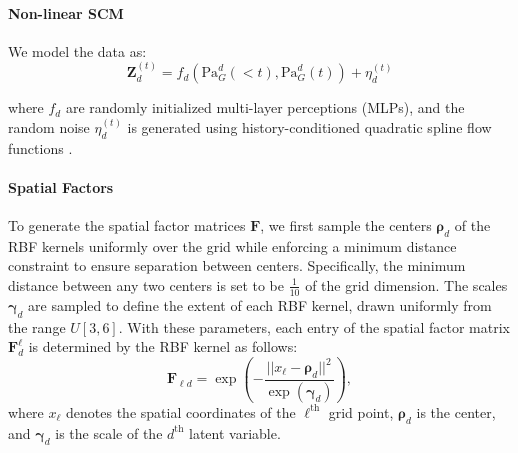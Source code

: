 \paragraph{Non-linear SCM} We model the data as:
\begin{equation*}
    \mathbf{Z}_d^{(t)} = f_{d}\left(\text{Pa}^d_G(<t), \text{Pa}^d_G(t)\right) + \eta_d^{(t)} 
\end{equation*}

where $f_d$ are randomly initialized multi-layer perceptions (MLPs), and the random noise $\eta_d^{(t)}$ is generated using history-conditioned quadratic spline flow functions \citep{durkan2019neural}. 

\paragraph{Spatial Factors} 

To generate the spatial factor matrices $\mathbf{F}$, we first sample the centers $\boldsymbol{\rho}_d$ of the RBF kernels uniformly over the grid while enforcing a minimum distance constraint to ensure separation between centers. Specifically, the minimum distance between any two centers is set to be $\frac{1}{10}$ of the grid dimension. The scales $\boldsymbol{\gamma}_d$ are sampled to define the extent of each RBF kernel, drawn uniformly from the range ${U}[3, 6]$. With these parameters, each entry of the spatial factor matrix $\mathbf{F}_d^\ell$ is determined by the RBF kernel as follows:
\begin{equation*}
\mathbf{F}_{\ell d} = \exp\left( -\frac{||x_\ell - \boldsymbol{\rho}_d||^2}{\exp(\boldsymbol{\gamma}_d)} \right),
\end{equation*}
where $x_\ell$ denotes the spatial coordinates of the $\ell^\text{th}$ grid point, $\boldsymbol{\rho}_d$ is the center, and $\boldsymbol{\gamma}_d$ is the scale of the $d^\text{th}$ latent variable.

